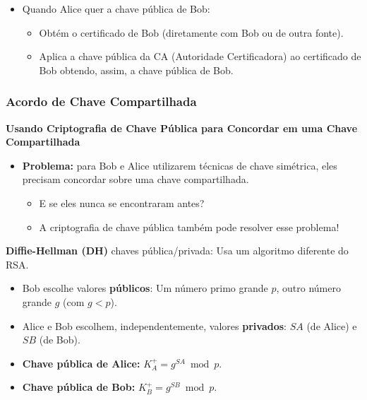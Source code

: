     \begin{itemize}[left=0.5cm, align=left, nosep]
        \item Quando Alice quer a chave pública de Bob:
        \begin{itemize}[left=0.5cm, nosep, label=$\hookrightarrow$]
            \item Obtém o certificado de Bob (diretamente com Bob ou de outra fonte).
            \item Aplica a chave pública da CA (Autoridade Certificadora) ao certificado de Bob obtendo, assim, a chave pública de Bob.
        \end{itemize}
    \end{itemize}

\vspace{1cm}
\subsubsection{Acordo de Chave Compartilhada}

    \textbf{Usando Criptografia de Chave Pública para Concordar em uma Chave Compartilhada}

    \begin{itemize}[left=0.5cm, align=left, nosep]
        \item \textbf{Problema:} para Bob e Alice utilizarem técnicas de chave simétrica, eles precisam concordar sobre uma chave compartilhada.
        \begin{itemize}[left=0.5cm, nosep, label=$\hookrightarrow$]
            \item E se eles nunca se encontraram antes?
            \item A criptografia de chave pública também pode resolver esse problema!
        \end{itemize}
    \end{itemize}

    \textbf{Diffie-Hellman (DH)} chaves pública/privada: Usa um algoritmo diferente do RSA.
    \begin{itemize}[left=0.5cm, align=left, nosep]
        \item Bob escolhe valores \textbf{públicos}: Um número primo grande $p$, outro número grande $g$ (com $g < p$).
        \item Alice e Bob escolhem, independentemente, valores \textbf{privados}: $SA$ (de Alice) e $SB$ (de Bob).
        \item \textbf{Chave pública de Alice:} $K_{A}^+ = g^{SA} \bmod p$.
        \item \textbf{Chave pública de Bob:} $K_{B}^+ = g^{SB} \bmod p$.
    \end{itemize}

